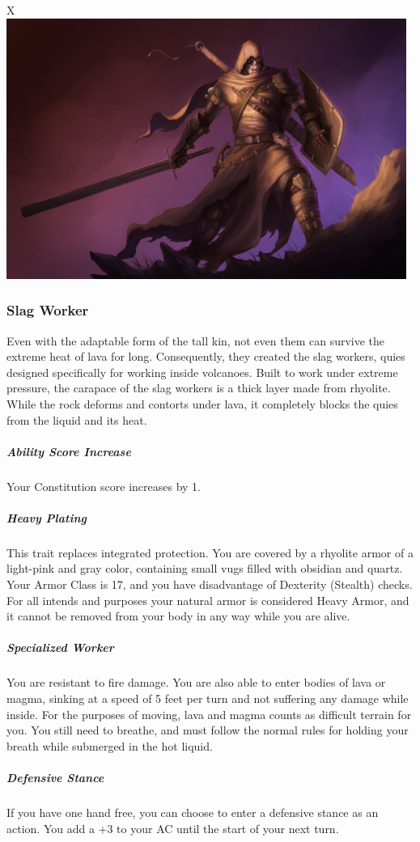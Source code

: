 \begin{table}[b]%
    \begin{DndTable}[width=\linewidth]{X}
        \includegraphics[width=0.98\textwidth]{04kins/img/21quies_executioner.jpg}
    \end{DndTable}
\end{table}

\subsubsection{Slag Worker}
    Even with the adaptable form of the tall kin, not even them can survive the extreme heat of lava for long.
    Consequently, they created the slag workers, quies designed specifically for working inside volcanoes.
    Built to work under extreme pressure, the carapace of the slag workers is a thick layer made from rhyolite.
    While the rock deforms and contorts under lava, it completely blocks the quies from the liquid and its heat.

    \subparagraph{Ability Score Increase} Your Constitution score increases by 1.

    \subparagraph{Heavy Plating} This trait replaces integrated protection.
    You are covered by a rhyolite armor of a light-pink and gray color, containing small vugs filled with obsidian and quartz.
    Your Armor Class is 17, and you have disadvantage of Dexterity (Stealth) checks.
    For all intends and purposes your natural armor is considered Heavy Armor, and it cannot be removed from your body in any way while you are alive.

    \subparagraph{Specialized Worker} You are resistant to fire damage.
    You are also able to enter bodies of lava or magma, sinking at a speed of 5 feet per turn and not suffering any damage while inside.
    For the purposes of moving, lava and magma counts as difficult terrain for you.
    You still need to breathe, and must follow the normal rules for holding your breath while submerged in the hot liquid.

    \subparagraph{Defensive Stance} If you have one hand free, you can choose to enter a defensive stance as an action.
    You add a +3 to your AC until the start of your next turn.
